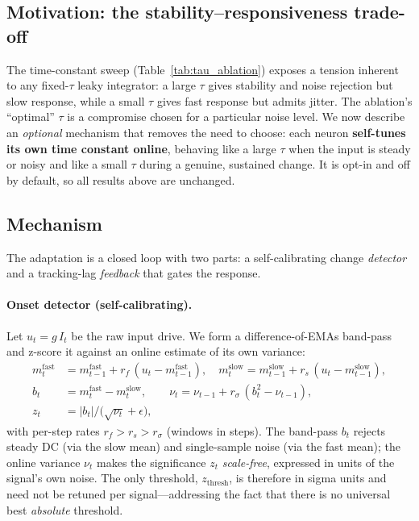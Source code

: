 \documentclass[11pt]{article}
\begin{document}
\subsection{Motivation: the stability--responsiveness trade-off}

The time-constant sweep (Table~\ref{tab:tau_ablation}) exposes a tension inherent
to any fixed-$\tau$ leaky integrator: a large $\tau$ gives stability and noise
rejection but slow response, while a small $\tau$ gives fast response but
admits jitter. The ablation's ``optimal'' $\tau$ is a compromise chosen for a
particular noise level. We now describe an \emph{optional} mechanism that
removes the need to choose: each neuron \textbf{self-tunes its own time
constant online}, behaving like a large $\tau$ when the input is steady or noisy
and like a small $\tau$ during a genuine, sustained change. It is opt-in and off
by default, so all results above are unchanged.

\subsection{Mechanism}

The adaptation is a closed loop with two parts: a self-calibrating change
\emph{detector} and a tracking-lag \emph{feedback} that gates the response.

\paragraph{Onset detector (self-calibrating).} Let $u_t = g\,I_t$ be the raw
input drive. We form a difference-of-EMAs band-pass and z-score it against an
online estimate of its own variance:
\begin{align}
m^{\text{fast}}_t &= m^{\text{fast}}_{t-1} + r_f\,(u_t - m^{\text{fast}}_{t-1}), \quad
m^{\text{slow}}_t = m^{\text{slow}}_{t-1} + r_s\,(u_t - m^{\text{slow}}_{t-1}), \\
b_t &= m^{\text{fast}}_t - m^{\text{slow}}_t, \qquad
\nu_t = \nu_{t-1} + r_\sigma\,(b_t^2 - \nu_{t-1}), \\
z_t &= |b_t| \big/ \big(\sqrt{\nu_t} + \epsilon\big),
\end{align}
with per-step rates $r_f > r_s > r_\sigma$ (windows in steps). The band-pass
$b_t$ rejects steady DC (via the slow mean) and single-sample noise (via the
fast mean); the online variance $\nu_t$ makes the significance $z_t$
\emph{scale-free}, expressed in units of the signal's own noise. The only
threshold, $z_{\text{thresh}}$, is therefore in sigma units and need not be
retuned per signal---addressing the fact that there is no universal best
\emph{absolute} threshold.
\end{document}
